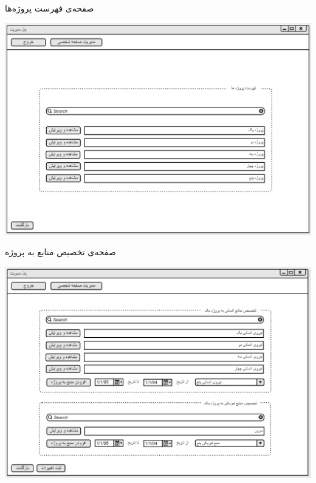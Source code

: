 \documentclass{article}
\begin{document}
\vspace{1cm}
صفحه‌ی فهرست پروژه‌ها
\begin{center}
\includegraphics[width=\textwidth]{Prototype/HeadManager/HeadManagerProjectsList.png}
\end{center}

\newpage
\vspace{1cm}
صفحه‌ی تخصیص منابع به پروژه
\begin{center}
\includegraphics[width=\textwidth]{Prototype/HeadManager/ResourceAssigment.png}
\end{center}
\end{document}
